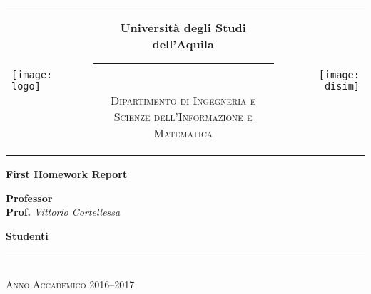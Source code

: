 \begin{titlepage}
\begin{center}
\normalsize

\begin{center}

\begin{tabular}[t]{@{} l @{} c @{} r @{}}
\parbox[c]{0.15\textwidth}{\raggedright \texttt{[image: logo]}}
&
\parbox[c]{0.7\textwidth}
{
\centering \bfseries
Università degli Studi dell'Aquila \\[-5pt]
\rule{0.6\textwidth}{1pt} \\
{\centering \scshape \small Dipartimento di Ingegneria e \\Scienze dell'Informazione e Matematica} \\
}
&
\parbox[c]{0.15\textwidth}{\raggedleft \texttt{[image: disim]}}
\end{tabular}
\end{center}

\bigskip \bigskip



\bigskip
\bigskip
\bigskip

\vfil

{\bfseries \huge
First Homework Report \\
}

{\large
\bigskip
\bigskip
\bigskip
\bigskip
{\bfseries \large Professor \\ }
\bigskip
\textbf{Prof.} \textit{Vittorio Cortellessa} \\
}

{\bfseries \large
\bigskip
\bigskip
\bigskip
\bigskip
Studenti \\
}

\vfil
\vfil


\vspace{2\baselineskip}


\vfil \vfil \vfil

\rule{\textwidth}{1pt}\\
{\scshape Anno Accademico 2016--2017}

\end{center}
\end{titlepage}